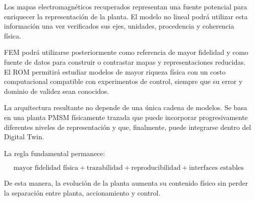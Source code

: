 Los mapas electromagnéticos recuperados representan una fuente potencial para enriquecer la representación de la planta. El modelo no lineal podrá utilizar esta información una vez verificados sus ejes, unidades, procedencia y coherencia física.

FEM podrá utilizarse posteriormente como referencia de mayor fidelidad y como fuente de datos para construir o contrastar mapas y representaciones reducidas. El ROM permitirá estudiar modelos de mayor riqueza física con un costo computacional compatible con experimentos de control, siempre que su error y dominio de validez sean conocidos.

La arquitectura resultante no depende de una única cadena de modelos. Se basa en una planta PMSM físicamente trazada que puede incorporar progresivamente diferentes niveles de representación y que, finalmente, puede integrarse dentro del Digital Twin.

La regla fundamental permanece:

\begin{equation}
\boxed{
\text{mayor fidelidad física}
+
\text{trazabilidad}
+
\text{reproducibilidad}
+
\text{interfaces estables}
}
\end{equation}

De esta manera, la evolución de la planta aumenta su contenido físico sin perder la separación entre planta, accionamiento y control.
